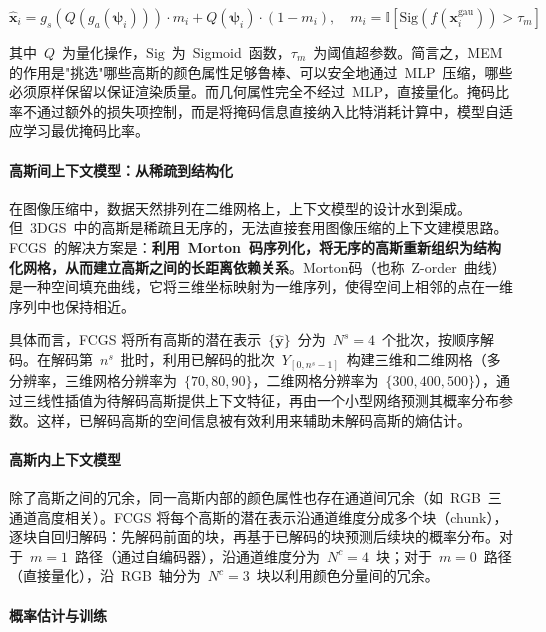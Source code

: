 \begin{equation}
\hat{\mathbf{x}}_i = g_s(Q(g_a(\boldsymbol{\psi}_i))) \cdot m_i + Q(\boldsymbol{\psi}_i) \cdot (1 - m_i), \quad m_i = \mathbb{I}[\mathrm{Sig}(f(\mathbf{x}_i^{\mathrm{gau}})) > \tau_m]
\end{equation}

其中~$Q$~为量化操作，$\mathrm{Sig}$~为~Sigmoid~函数，$\tau_m$~为阈值超参数。简言之，MEM 的作用是"挑选"哪些高斯的颜色属性足够鲁棒、可以安全地通过~MLP~压缩，哪些必须原样保留以保证渲染质量。而几何属性完全不经过~MLP，直接量化。掩码比率不通过额外的损失项控制，而是将掩码信息直接纳入比特消耗计算中，模型自适应学习最优掩码比率。

\paragraph{高斯间上下文模型：从稀疏到结构化}

在图像压缩中，数据天然排列在二维网格上，上下文模型的设计水到渠成。但~3DGS~中的高斯是稀疏且无序的，无法直接套用图像压缩的上下文建模思路。FCGS~的解决方案是：\textbf{利用~Morton~码序列化，将无序的高斯重新组织为结构化网格，从而建立高斯之间的长距离依赖关系}。Morton码（也称~Z-order~曲线）是一种空间填充曲线，它将三维坐标映射为一维序列，使得空间上相邻的点在一维序列中也保持相近。

具体而言，FCGS 将所有高斯的潜在表示~$\{\hat{\mathbf{y}}\}$~分为~$N^s = 4$~个批次，按顺序解码。在解码第~$n^s$~批时，利用已解码的批次~$Y_{[0, n^s-1]}$~构建三维和二维网格（多分辨率，三维网格分辨率为~$\{70, 80, 90\}$，二维网格分辨率为~$\{300, 400, 500\}$），通过三线性插值为待解码高斯提供上下文特征，再由一个小型网络预测其概率分布参数。这样，已解码高斯的空间信息被有效利用来辅助未解码高斯的熵估计。

\paragraph{高斯内上下文模型}

除了高斯之间的冗余，同一高斯内部的颜色属性也存在通道间冗余（如~RGB~三通道高度相关）。FCGS 将每个高斯的潜在表示沿通道维度分成多个块（chunk），逐块自回归解码：先解码前面的块，再基于已解码的块预测后续块的概率分布。对于~$m=1$~路径（通过自编码器），沿通道维度分为~$N^c=4$~块；对于~$m=0$~路径（直接量化），沿~RGB~轴分为~$N^c=3$~块以利用颜色分量间的冗余。

\paragraph{概率估计与训练}

